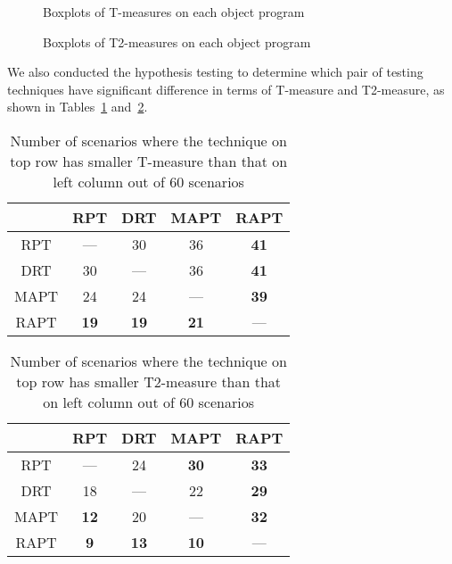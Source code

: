 \documentclass[10pt,journal,compsoc]{IEEEtran}
\begin{document}
\begin{figure*}[tp]
	\centering
	\caption{Boxplots of T-measures on each object program}
	\label{fig:Tmeasure}
\end{figure*}

\begin{figure*}[tp]
	\centering
	\caption{Boxplots of T2-measures on each object program}
	\label{fig:T2measure}
\end{figure*}

We also conducted the hypothesis testing to determine which pair of testing techniques have significant difference in terms of T-measure and T2-measure, as shown in Tables~\ref{tab:Tsta} and~\ref{tab:T2sta}.

\begin{table}
\caption{Number of scenarios where the technique on top row has smaller T-measure than that on left column out of 60 scenarios}
\label{tab:Tsta}
\centering
\begin{tabular}{|c|c|c|c|c|} \hline
			& RPT					& DRT					& MAPT				& RAPT				\\ \hline
RPT		& ---					& 30					& 36					& \textbf{41}	\\ \hline
DRT		& 30					& ---					& 36					& \textbf{41}	\\ \hline
MAPT	& 24					& 24					& ---					& \textbf{39}	\\ \hline
RAPT	& \textbf{19}	& \textbf{19}	& \textbf{21}	& ---					\\ \hline
\end{tabular}
\end{table}

\begin{table}
\caption{Number of scenarios where the technique on top row has smaller T2-measure than that on left column out of 60 scenarios}
\label{tab:T2sta}
\centering
\begin{tabular}{|c|c|c|c|c|} \hline
			& RPT					& DRT					& MAPT				& RAPT				\\ \hline
RPT		& ---					& 24					& \textbf{30}	& \textbf{33}	\\ \hline
DRT		& 18					& ---					& 22					& \textbf{29}	\\ \hline
MAPT	& \textbf{12}	& 20					& ---					& \textbf{32}	\\ \hline
RAPT	& \textbf{9}	& \textbf{13}	& \textbf{10}	& ---					\\ \hline
\end{tabular}
\end{table}
\end{document}
